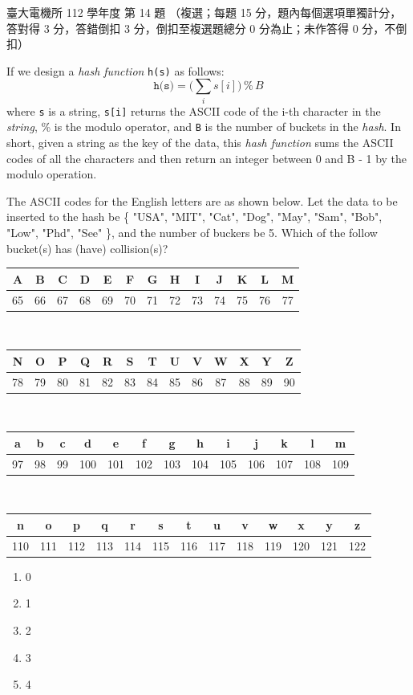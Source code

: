 \begin{pastexam}[label={px:ntu-112-ee-ds-14}]{臺大電機所 112 學年度 第 14 題}
（複選；每題 15 分，題內每個選項單獨計分，答對得 3 分，答錯倒扣 3 分，倒扣至複選題總分 0 分為止；未作答得 0 分，不倒扣）

If we design a \textit{hash function} \texttt{h(s)} as follows:
\[ \texttt{h(s)} = \Big(\sum_i s[i]\Big)\,\%\,B \]
where \texttt{s} is a string, \texttt{s[i]} returns the ASCII code of the i-th character in the \textit{string}, \% is the modulo operator, and \texttt{B} is the number of buckets in the \textit{hash}. In short, given a string as the key of the data, this \textit{hash function} sums the ASCII codes of all the characters and then return an integer between 0 and B - 1 by the modulo operation.

The ASCII codes for the English letters are as shown below. Let the data to be inserted to the hash be \{ "USA", "MIT", "Cat", "Dog", "May", "Sam", "Bob", "Low", "Phd", "See" \}, and the number of buckers be 5. Which of the follow bucket(s) has (have) collision(s)?

\begin{center}\small\setlength{\tabcolsep}{3pt}
\begin{tabular}{|*{13}{c|}}
\hline
A&B&C&D&E&F&G&H&I&J&K&L&M\\ \hline
65&66&67&68&69&70&71&72&73&74&75&76&77\\ \hline
\end{tabular}\\[4pt]
\begin{tabular}{|*{13}{c|}}
\hline
N&O&P&Q&R&S&T&U&V&W&X&Y&Z\\ \hline
78&79&80&81&82&83&84&85&86&87&88&89&90\\ \hline
\end{tabular}\\[4pt]
\begin{tabular}{|*{13}{c|}}
\hline
a&b&c&d&e&f&g&h&i&j&k&l&m\\ \hline
97&98&99&100&101&102&103&104&105&106&107&108&109\\ \hline
\end{tabular}\\[4pt]
\begin{tabular}{|*{13}{c|}}
\hline
n&o&p&q&r&s&t&u&v&w&x&y&z\\ \hline
110&111&112&113&114&115&116&117&118&119&120&121&122\\ \hline
\end{tabular}
\end{center}
\begin{enumerate}[label=(\Alph*)]
\item 0
\item 1
\item 2
\item 3
\item 4
\end{enumerate}
\end{pastexam}

